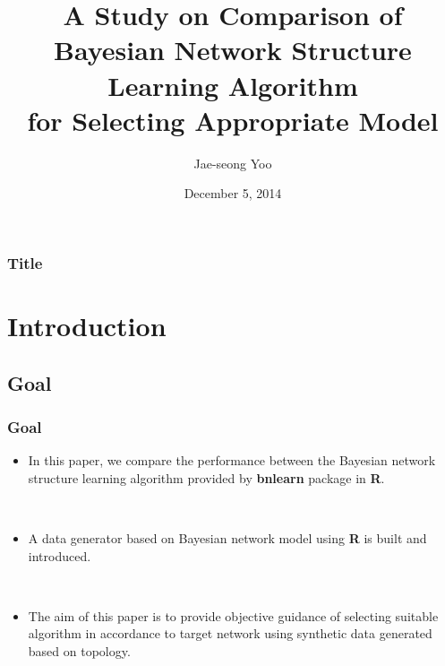 \documentclass{beamer}
\title[Title]{A Study on Comparison of\\ Bayesian Network Structure Learning Algorithm\\ for Selecting Appropriate Model}
\author[Joe]{Jae-seong Yoo}
\institute[]{Dept. of Statistics}
\date{December 5, 2014}
\begin{document}


\begin{frame}
\frametitle{Title}
{\scriptsize{}
	\tableofcontents
}
\end{frame}


\section{Introduction}
\subsection{Goal}
\begin{frame}
\frametitle{Goal}
{\scriptsize{}
\begin{itemize}
	\item In this paper, we compare the performance between the Bayesian network structure learning algorithm provided by \textbf{bnlearn} package in \textbf{R}.

	{}\

	\item A data generator based on Bayesian network model using \textbf{R} is built and introduced.

	{}\

	\item The aim of this paper is to provide objective guidance of selecting suitable algorithm in accordance to target network using synthetic data generated based on topology.
\end{itemize}
}
\end{frame}
\end{document}

